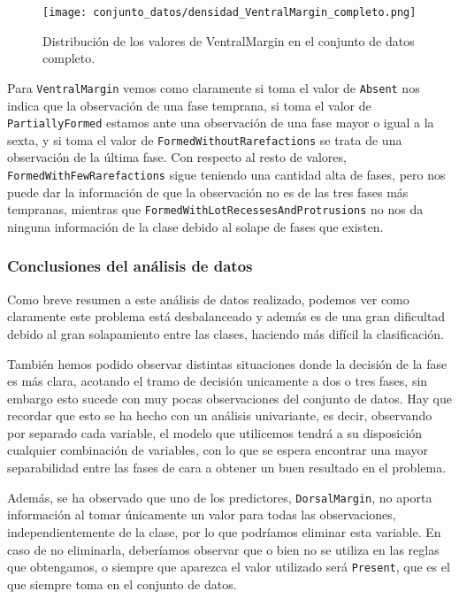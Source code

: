 \begin{figure}[H]
	\centering
	\texttt{[image: conjunto\_datos/densidad\_VentralMargin\_completo.png]}
	\caption{Distribución de los valores de VentralMargin en el conjunto de datos completo.}
	\label{fig:densidad_VentralMargin_completo}
\end{figure}


Para \texttt{VentralMargin} vemos como claramente si toma el valor de \texttt{Absent} nos indica que la observación de una fase temprana, si toma el valor de \texttt{PartiallyFormed} estamos ante una observación de una fase mayor o igual a la sexta, y si toma el valor de \texttt{FormedWithoutRarefactions} se trata de una observación de la última fase. Con respecto al resto de valores, \texttt{FormedWithFewRarefactions} sigue teniendo una cantidad alta de fases, pero nos puede dar la información de que la observación no es de las tres fases más tempranas, mientras que \texttt{FormedWithLotRecessesAndProtrusions} no nos da ninguna información de la clase debido al solape de fases que existen.



\subsubsection{Conclusiones del análisis de datos}

Como breve resumen a este análisis de datos realizado, podemos ver como claramente este problema está desbalanceado y además es de una gran dificultad debido al gran solapamiento entre las clases, haciendo más difícil la clasificación.

También hemos podido observar distintas situaciones donde la decisión de la fase es más clara, acotando el tramo de decisión unicamente a dos o tres fases, sin embargo esto sucede con muy pocas observaciones del conjunto de datos. Hay que recordar que esto se ha hecho con un análisis univariante, es decir, observando por separado cada variable, el modelo que utilicemos tendrá a su disposición cualquier combinación de variables, con lo que se espera encontrar una mayor separabilidad entre las fases de cara a obtener un buen resultado en el problema.

Además, se ha observado que uno de los predictores, \texttt{DorsalMargin}, no aporta información al tomar únicamente un valor para todas las observaciones, independientemente de la clase, por lo que podríamos eliminar esta variable. En caso de no eliminarla, deberíamos observar que o bien no se utiliza en las reglas que obtengamos, o siempre que aparezca el valor utilizado será \texttt{Present}, que es el que siempre toma en el conjunto de datos.

